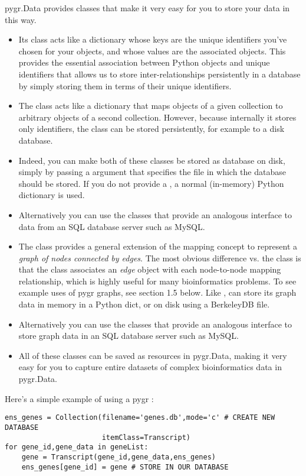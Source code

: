 \documentclass{howto}
\begin{document}
pygr.Data provides classes that make it very easy for you to store your
data in this way.  
\begin{itemize}
\item Its  class acts like a dictionary
whose keys are the unique identifiers you've chosen for your objects,
and whose values are the associated objects.  This provides the essential
association between Python objects and unique identifiers that allows
us to store inter-relationships persistently in a database by simply
storing them in terms of their unique identifiers.

\item The  class
acts like a dictionary that maps objects of a given collection to
arbitrary objects of a second collection.  However, because internally
it stores only identifiers, the  class can be stored
persistently, for example to a disk database.  

\item Indeed, you can make both of
these classes be stored as database on disk, simply by passing a 
argument that specifies the file in which the database should be stored.
If you do not provide a , a normal (in-memory) Python dictionary
is used.  

\item Alternatively you can use the  classes that
provide an analogous interface to data from an SQL database server
such as MySQL.

\item The  class provides a general extension of the
mapping concept to represent a {\em graph of nodes connected by edges}.
The most obvious difference vs. the  class is that 
the  class associates an {\em edge} object with each
node-to-node mapping relationship, which is highly useful for many
bioinformatics problems.  To see example uses of pygr graphs, see
section 1.5 below.  Like ,  can store its graph data
in memory in a Python dict, or on disk using a BerkeleyDB file.

\item Alternatively you can use the  classes that
provide an analogous interface to store graph data in an SQL database server
such as MySQL.

\item All of these classes can be saved as resources in pygr.Data, making
it very easy for you to capture entire datasets of complex bioinformatics
data in pygr.Data.

\end{itemize}
Here's a simple example of using a pygr :
\begin{verbatim}
ens_genes = Collection(filename='genes.db',mode='c' # CREATE NEW DATABASE
                       itemClass=Transcript)
for gene_id,gene_data in geneList:
    gene = Transcript(gene_id,gene_data,ens_genes)
    ens_genes[gene_id] = gene # STORE IN OUR DATABASE
\end{verbatim}
\end{document}
